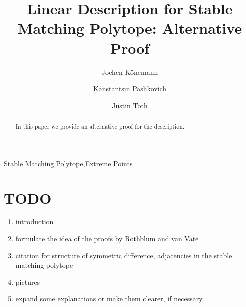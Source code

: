 \documentclass[preprint]{elsarticle}
\begin{document}
\begin{frontmatter}



\title{Linear Description for Stable Matching Polytope: Alternative Proof}
\author[co]{Jochen K\"{o}nemann}
\author[co]{Kanstantsin Pashkovich}
\author[co]{Justin Toth}
\address[co]{Department of Combinatorics and Optimization, University of Waterloo, Canada}


\begin{abstract}
In this paper we provide an alternative proof for the description.
\end{abstract}
\begin{keyword}
Stable Matching\sep Polytope\sep Extreme Points
\end{keyword}
\end{frontmatter}
{\color{red}
\section*{TODO}
\begin{enumerate}
	\item introduction
	\item formulate the idea of the proofs by Rothblum and van Vate
	\item citation for structure of symmetric difference, adjacencies in the stable matching polytope
	\item pictures
	\item expand some explanations or make them clearer, if necessary
\end{enumerate}
}
\end{document}
